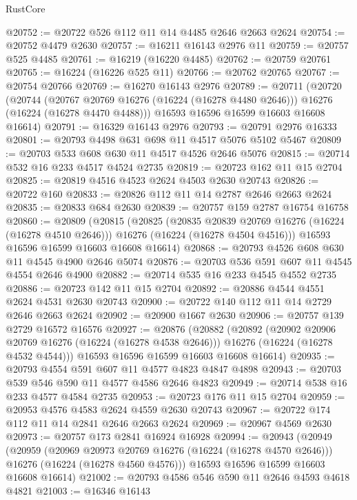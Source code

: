 \begin{lexlean}{RustCore}
\begin{coremodule}
@20752 := @20722 @526 @112 @11 @14 @4485 @2646 @2663 @2624
@20754 := @20752 @4479 @2630
@20757 := @16211 @16143 @2976 @11
@20759 := @20757 @525 @4485
@20761 := @16219 (@16220 @4485)
@20762 := @20759 @20761
@20765 := @16224 (@16226 @525 @11)
@20766 := @20762 @20765
@20767 := @20754 @20766
@20769 := @16270 @16143 @2976
@20789 := @20711
    (@20720
      (@20744
        (@20767 @20769 @16276 (@16224 (@16278 @4480 @2646)))
        @16276
        (@16224 (@16278 @4470 @4488)))
      @16593
      @16596
      @16599
      @16603
      @16608
      @16614)
@20791 := @16329 @16143 @2976
@20793 := @20791 @2976 @16333
@20801 := @20793 @4498 @631 @698 @11 @4517 @5076 @5102 @5467
@20809 := @20703 @533 @608 @630 @11 @4517 @4526 @2646 @5076
@20815 := @20714 @532 @16 @233 @4517 @4524 @2735
@20819 := @20723 @162 @11 @15 @2704
@20825 := @20819 @4516 @4523 @2624 @4503 @2630 @20743
@20826 := @20722 @160
@20833 := @20826 @112 @11 @14 @2787 @2646 @2663 @2624
@20835 := @20833 @684 @2630
@20839 := @20757 @159 @2787 @16754 @16758
@20860 := @20809
    (@20815
      (@20825
        (@20835 @20839 @20769 @16276 (@16224 (@16278 @4510 @2646)))
        @16276
        (@16224 (@16278 @4504 @4516)))
      @16593
      @16596
      @16599
      @16603
      @16608
      @16614)
@20868 := @20793 @4526 @608 @630 @11 @4545 @4900 @2646 @5074
@20876 := @20703 @536 @591 @607 @11 @4545 @4554 @2646 @4900
@20882 := @20714 @535 @16 @233 @4545 @4552 @2735
@20886 := @20723 @142 @11 @15 @2704
@20892 := @20886 @4544 @4551 @2624 @4531 @2630 @20743
@20900 := @20722 @140 @112 @11 @14 @2729 @2646 @2663 @2624
@20902 := @20900 @1667 @2630
@20906 := @20757 @139 @2729 @16572 @16576
@20927 := @20876
    (@20882
      (@20892
        (@20902 @20906 @20769 @16276 (@16224 (@16278 @4538 @2646)))
        @16276
        (@16224 (@16278 @4532 @4544)))
      @16593
      @16596
      @16599
      @16603
      @16608
      @16614)
@20935 := @20793 @4554 @591 @607 @11 @4577 @4823 @4847 @4898
@20943 := @20703 @539 @546 @590 @11 @4577 @4586 @2646 @4823
@20949 := @20714 @538 @16 @233 @4577 @4584 @2735
@20953 := @20723 @176 @11 @15 @2704
@20959 := @20953 @4576 @4583 @2624 @4559 @2630 @20743
@20967 := @20722 @174 @112 @11 @14 @2841 @2646 @2663 @2624
@20969 := @20967 @4569 @2630
@20973 := @20757 @173 @2841 @16924 @16928
@20994 := @20943
    (@20949
      (@20959
        (@20969 @20973 @20769 @16276 (@16224 (@16278 @4570 @2646)))
        @16276
        (@16224 (@16278 @4560 @4576)))
      @16593
      @16596
      @16599
      @16603
      @16608
      @16614)
@21002 := @20793 @4586 @546 @590 @11 @2646 @4593 @4618 @4821
@21003 := @16346 @16143

\end{coremodule}
\end{lexlean}
